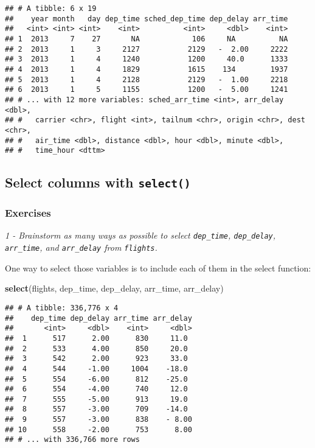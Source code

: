 \documentclass[]{article}
\newenvironment{Shaded}{\begin{snugshade}}{\end{snugshade}}
\newcommand{\KeywordTok}[1]{\textcolor[rgb]{0.13,0.29,0.53}{\textbf{#1}}}
\newcommand{\NormalTok}[1]{#1}
\theoremstyle{definition}
\theoremstyle{definition}
\theoremstyle{definition}
\theoremstyle{remark}
\begin{document}
\begin{verbatim}
## # A tibble: 6 x 19
##    year month   day dep_time sched_dep_time dep_delay arr_time
##   <int> <int> <int>    <int>          <int>     <dbl>    <int>
## 1  2013     7    27       NA            106     NA          NA
## 2  2013     1     3     2127           2129   -  2.00     2222
## 3  2013     1     4     1240           1200     40.0      1333
## 4  2013     1     4     1829           1615    134        1937
## 5  2013     1     4     2128           2129   -  1.00     2218
## 6  2013     1     5     1155           1200   -  5.00     1241
## # ... with 12 more variables: sched_arr_time <int>, arr_delay <dbl>,
## #   carrier <chr>, flight <int>, tailnum <chr>, origin <chr>, dest <chr>,
## #   air_time <dbl>, distance <dbl>, hour <dbl>, minute <dbl>,
## #   time_hour <dttm>
\end{verbatim}

\subsection{\texorpdfstring{Select columns with
\texttt{select()}}{Select columns with select()}}\label{select-columns-with-select}

\subsubsection{Exercises}\label{exercises-9}

\emph{1 - Brainstorm as many ways as possible to select
\texttt{dep\_time}, \texttt{dep\_delay}, \texttt{arr\_time}, and
\texttt{arr\_delay} from \texttt{flights}.}

One way to select those variables is to include each of them in the
select function:

\begin{Shaded}
\begin{Highlighting}[]
\KeywordTok{select}\NormalTok{(flights, dep_time, dep_delay, arr_time, arr_delay)}
\end{Highlighting}
\end{Shaded}

\begin{verbatim}
## # A tibble: 336,776 x 4
##    dep_time dep_delay arr_time arr_delay
##       <int>     <dbl>    <int>     <dbl>
##  1      517      2.00      830     11.0 
##  2      533      4.00      850     20.0 
##  3      542      2.00      923     33.0 
##  4      544     -1.00     1004    -18.0 
##  5      554     -6.00      812    -25.0 
##  6      554     -4.00      740     12.0 
##  7      555     -5.00      913     19.0 
##  8      557     -3.00      709    -14.0 
##  9      557     -3.00      838    - 8.00
## 10      558     -2.00      753      8.00
## # ... with 336,766 more rows
\end{verbatim}
\end{document}
